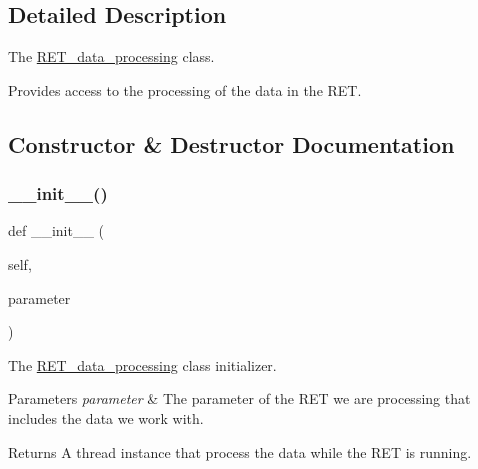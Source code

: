 \subsection{Detailed Description}
The \hyperlink{classRET__data__processing_1_1RET__data__processing}{R\+E\+T\+\_\+data\+\_\+processing} class. 

Provides access to the processing of the data in the R\+ET. 

\subsection{Constructor \& Destructor Documentation}
\mbox{\label{classRET__data__processing_1_1RET__data__processing_a297f3b1ee42e9ff40c0ec84bb5996ea5}} 
\subsubsection{\texorpdfstring{\+\_\+\+\_\+init\+\_\+\+\_\+()}{\_\_init\_\_()}}
{\footnotesize\ttfamily def \+\_\+\+\_\+init\+\_\+\+\_\+ (\begin{DoxyParamCaption}\item[{}]{self,  }\item[{}]{parameter }\end{DoxyParamCaption})}



The \hyperlink{classRET__data__processing_1_1RET__data__processing}{R\+E\+T\+\_\+data\+\_\+processing} class initializer. 


\begin{DoxyParams}{Parameters}
{\em parameter} & The parameter of the R\+ET we are processing that includes the data we work with. \\
\hline
\end{DoxyParams}
\begin{DoxyReturn}{Returns}
A thread instance that process the data while the R\+ET is running. 
\end{DoxyReturn}


